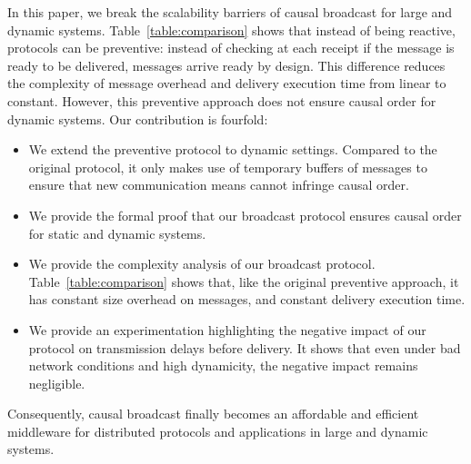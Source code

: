 
In this paper, we break the scalability barriers of causal broadcast for large
and dynamic systems. Table~\ref{table:comparison} shows that instead of being
reactive, protocols can be preventive: instead of checking at each receipt if
the message is ready to be delivered, messages arrive ready by design.
This difference reduces the complexity of message overhead and delivery
execution time from linear to constant.
However, this preventive approach does not ensure causal order for dynamic
systems.
Our contribution is fourfold:
\begin{itemize}[leftmargin=*]
\item We extend the preventive protocol to dynamic settings. Compared to the
  original protocol, it only makes use of temporary buffers of messages to
  ensure that new communication means cannot infringe causal order.
\item We provide the formal proof that our broadcast protocol ensures causal
  order for static and dynamic systems.
\item We provide the complexity analysis of our broadcast
  protocol. Table~\ref{table:comparison} shows that, like the original
  preventive approach, it has constant size overhead on messages, and constant
  delivery execution time.
\item We provide an experimentation highlighting the negative impact of our
  protocol on transmission delays before delivery. It shows that even under bad
  network conditions and high dynamicity, the negative impact remains
  negligible.
\end{itemize}
Consequently, causal broadcast finally becomes an affordable and efficient
middleware for distributed protocols and applications in large and dynamic
systems.

